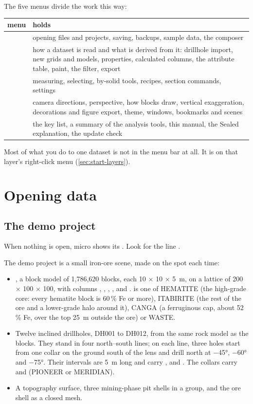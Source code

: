 The five menus divide the work this way:

\begin{tabularx}{\linewidth}{@{}lL@{}}\toprule
menu & holds \\ \midrule
{} & opening files and projects, saving, backups, sample data, the composer \\
 & how a dataset is read and what is derived from it: drillhole import, new grids and models, properties, calculated columns, the attribute table, paint, the filter, export \\
 & measuring, selecting, by-solid tools, recipes, section commands, settings \\
 & camera directions, perspective, how blocks draw, vertical exaggeration, decorations and figure export, theme, windows, bookmarks and scenes \\
 & the key list, a summary of the analysis tools, this manual, the Sealed explanation, the update check \\
\bottomrule
\end{tabularx}

Most of what you do to one dataset is not in the menu bar at all. It is on that layer's right-click menu (\cref{sec:start-layers}).

\section{Opening data}\label{sec:start-data}
\subsection{The demo project}
When nothing is open, micro shows its . Look for the line .


The demo project is a small iron-ore scene, made on the spot each time:

\begin{itemize}
\item {}, a block model of 1,786,620 blocks, each 10 × 10 × 5~m, on a lattice of 200 × 100 × 100, with columns , , , ,  and .  is one of HEMATITE (the high-grade core: every hematite block is 60\,\% Fe or more), ITABIRITE (the rest of the ore and a lower-grade halo around it), CANGA (a ferruginous cap, about 52\,\% Fe, over the top 25~m outside the ore) or WASTE.
\item Twelve inclined drillholes, DH001 to DH012, from the same rock model as the blocks. They stand in four north–south lines; on each line, three holes start from one collar on the ground south of the lens and drill north at −45°, −60° and −75°. Their intervals are 5~m long and carry ,  and . The collars carry  and  (PIONEER or MERIDIAN).
\item A topography surface, three mining-phase pit shells in a group, and the ore shell as a closed mesh.
\end{itemize}

